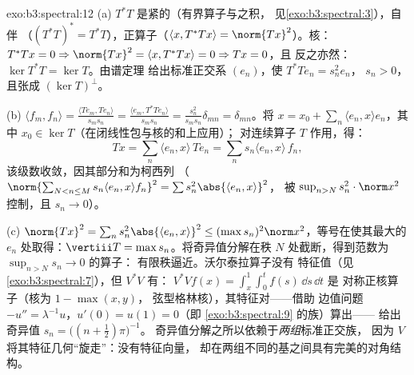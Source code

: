 \begin{solution}{exo:b3:spectral:12}
(a) $T^*T$ 是紧的（有界算子与之积，
见\cref{exo:b3:spectral:3}），自伴
（$(T^*T)^* = T^*T$），正算子（$\langle x, T^*Tx\rangle =
\norm{Tx}^2$）。核：$T^*Tx = 0 \Rightarrow \norm{Tx}^2 =
\langle x, T^*Tx\rangle = 0 \Rightarrow Tx = 0$，且
反之亦然：$\ker T^*T = \ker T$。由谱定理
给出标准正交系 $(e_n)$，使 $T^*Te_n = s_n^2e_n$，
$s_n > 0$，且张成 $(\ker T)^\perp$。

(b) $\langle f_m, f_n\rangle = \frac{\langle Te_m,
Te_n\rangle}{s_ms_n} = \frac{\langle e_m,
T^*Te_n\rangle}{s_ms_n} = \frac{s_n^2}{s_ms_n}\delta_{mn} =
\delta_{mn}$。将 $x = x_0 + \sum_n\langle e_n, x\rangle
e_n$，其中 $x_0 \in \ker T$（在闭线性包与核的和上应用）；
对连续算子 $T$ 作用，得：
\[
Tx = \sum_n\langle e_n, x\rangle\,Te_n =
\sum_ns_n\langle e_n, x\rangle\,f_n,
\]
该级数收敛，因其部分和为柯西列
（$\norm{\sum_{N<n\leq M}s_n\langle e_n, x\rangle f_n}^2 =
\sum s_n^2\abs{\langle e_n, x\rangle}^2$，
被 $\sup_{n>N}s_n^2\cdot\norm x^2$ 控制，且 $s_n \to 0$）。

(c) $\norm{Tx}^2 = \sum_ns_n^2\abs{\langle e_n, x\rangle}^2
\leq (\max s_n)^2\norm x^2$，等号在使其最大的
$e_n$ 处取得：$\vertiii T = \max s_n$。将奇异值分解在秩
$N$ 处截断，得到范数为 $\sup_{n>N}s_n \to 0$ 的算子：
有限秩逼近。沃尔泰拉算子没有
特征值（见\cref{exo:b3:spectral:7}），但 $V^*V$ 有：
$V^*Vf(x) = \int_x^1\int_0^tf(s)\,\dd s\,\dd t$ 是
对称正核算子（核为 $1 - \max(x,y)$，
弦型格林核），其特征对——借助
边值问题 $-u'' = \lambda^{-1}u$，$u'(0)
= u(1) = 0$（即 \cref{exo:b3:spectral:9} 的族）算出——
给出奇异值 $s_n = \bigl((n + \frac12)\pi\bigr)^{-1}$。
奇异值分解之所以依赖于\emph{两组}标准正交族，
因为 $V$ 将其特征几何“旋走”：没有特征向量，
却在两组不同的基之间具有完美的对角结构。
\end{solution}

